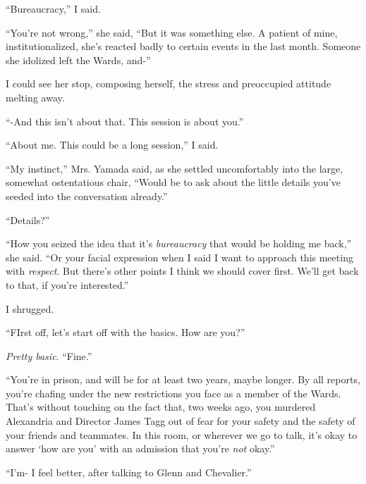``Bureaucracy,'' I said.



``You're not wrong,'' she said, ``But it was something else.  A patient of mine, institutionalized, she's reacted badly to certain events in the last month.  Someone she idolized left the Wards, and-''



I could see her stop, composing herself, the stress and preoccupied attitude melting away.



``-And this isn't about that.  This session is about you.''



``About me.  This could be a long session,'' I said.



``My instinct,'' Mrs. Yamada said, as she settled uncomfortably into the large, somewhat ostentatious chair, ``Would be to ask about the little details you've seeded into the conversation already.''



``Details?''



``How you seized the idea that it's \emph{bureaucracy} that would be holding me back,'' she said.  ``Or your facial expression when I said I want to approach this meeting with \emph{respect}.  But there's other points I think we should cover first.  We'll get back to that, if you're interested.''



I shrugged.



``FIrst off, let's start off with the basics.  How are you?''



\emph{Pretty basic}.  ``Fine.''



``You're in prison, and will be for at least two years, maybe longer.  By all reports, you're chafing under the new restrictions you face as a member of the Wards.  That's without touching on the fact that, two weeks ago, you murdered Alexandria and Director James Tagg out of fear for your safety and the safety of your friends and teammates.  In this room, or wherever we go to talk, it's okay to answer `how are you' with an admission that you're \emph{not} okay.''



``I'm- I feel better, after talking to Glenn and Chevalier.''



